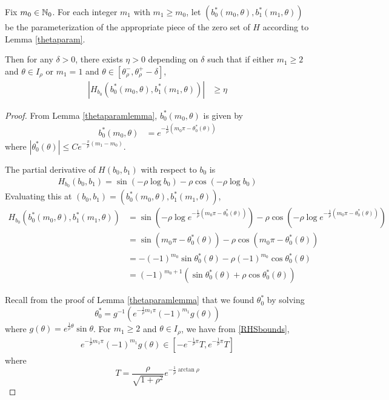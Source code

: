 \documentclass[thesis.tex]{subfiles}
\begin{document}
\begin{lemma}\label{Hderivboundslemma}
Fix $m_0 \in {\mathbb N}_0$. For each integer $m_1$ with $m_1 \geq m_0$, let $(b_0^*(m_0, \theta), b_1^*(m_1, \theta))$ be the parameterization of the appropriate piece of the zero set of $H$ according to Lemma \ref{thetaparam}. 

Then for any $\delta > 0$, there exists $\eta > 0$ depending on $\delta$ such that if either $m_1 \geq 2$ and $\theta \in I_\rho$ or $m_1 = 1$ and $\theta \in [\theta_\rho^-, \theta_\rho^+ - \delta]$,
\begin{align}\label{Hderivbound}
| H_{b_0}(b_0^*(m_0, \theta), b_1^*(m_1, \theta)) | &\geq \eta
\end{align}

\begin{proof}
From Lemma \ref{thetaparamlemma}, $b_0^*(m_0, \theta)$ is given by
\begin{align}\label{b0starexp}
b_0^*(m_0, \theta) &= e^{-\frac{1}{\rho}(m_0 \pi - \theta_0^*(\theta)) }
\end{align}
where $|\theta_0^*(\theta)| \leq C e^{ -\frac{\pi}{\rho}(m_1 - m_0)}$.

The partial derivative of $H(b_0, b_1)$ with respect to $b_0$ is
\begin{align}\label{Hb0}
H_{b_0} (b_0, b_1) = \sin(-\rho \log b_0) - \rho \cos(-\rho \log b_0)
\end{align}
Evaluating this at $(b_0, b_1) = (b_0^*(m_0, \theta), b_1^*(m_1, \theta))$, 
\begin{align*}
H_{b_0}(b_0^*(m_0, \theta), b_1^*(m_1, \theta)) &= \sin\left(-\rho \log e^{-\frac{1}{\rho}(m_0 \pi - \theta_0^*(\theta))} \right) - \rho \cos\left(-\rho \log e^{-\frac{1}{\rho}(m_0 \pi - \theta_0^*(\theta))} \right) \\
&= \sin\left(m_0 \pi - \theta_0^*(\theta) \right) - \rho \cos\left(m_0 \pi - \theta_0^*(\theta) \right) \\
&= -(-1)^{m_0} \sin \theta_0^*(\theta) - \rho (-1)^{m_0} \cos \theta_0^*(\theta) \\
&= (-1)^{m_0+1} \left( \sin \theta_0^*(\theta) + \rho \cos \theta_0^*(\theta) \right)
\end{align*}

Recall from the proof of Lemma \ref{thetaparamlemma} that we found $\theta_0^*$ by solving
\begin{equation*}
\theta_0^* = g^{-1}\left( e^{ -\frac{1}{\rho} m_1 \pi } (-1)^{m_1} g(\theta) \right)
\end{equation*}
where $g(\theta) = e^{ \frac{1}{\rho} \theta } \sin \theta$. For $m_1 \geq 2$ and $\theta \in I_\rho$, we have from \eqref{RHSbounds},
\begin{align}\label{RHSboundgeq2}
e^{ -\frac{1}{\rho} m_1 \pi } (-1)^{m_1} g(\theta) \in [-e^{ -\frac{1}{\rho} \pi } T, e^{ -\frac{1}{\rho} \pi } T]
\end{align}
where
\begin{equation*}
T = \frac{\rho}{\sqrt{1+\rho^2}}e^{-\frac{1}{\rho}\arctan \rho}
\end{equation*}


\end{proof}
\end{lemma}
\end{document}
